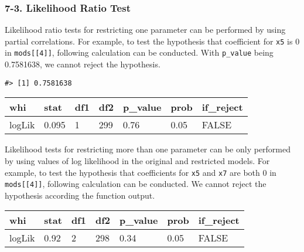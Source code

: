 \documentclass[main.tex]{subfiles}
\begin{document}
\hypertarget{likelihood-ratio-test}{%
\subsubsection{7-3. Likelihood Ratio Test}\label{likelihood-ratio-test}}

Likelihood ratio tests for restricting one parameter can be performed by
using partial correlations. For example, to test the hypothesis that
coefficient for \texttt{x5} is 0 in \texttt{mods{[}{[}4{]}{]}},
following calculation can be conducted. With \texttt{p\_value} being
0.7581638, we cannot reject the hypothesis.

\begin{Shaded}
\begin{Highlighting}[]
\StringTok{ }\OperatorTok{-}\StringTok{ } \OperatorTok{*}\StringTok{ }\NormalTok{(} \OperatorTok{-}\StringTok{ }\NormalTok{) }
\NormalTok{(} \OperatorTok{-}\StringTok{ }\NormalTok{))}
\end{Highlighting}
\end{Shaded}

\begin{verbatim}
#> [1] 0.7581638
\end{verbatim}

\begin{table}[H]
\centering
\begin{tabular}{lllllll}
\toprule
whi & stat & df1 & df2 & p\_value & prob & if\_reject\\
\midrule
logLik & 0.095 & 1 & 299 & 0.76 & 0.05 & FALSE\\
\bottomrule
\end{tabular}
\end{table}

Likelihood tests for restricting more than one parameter can be only
performed by using values of log likelihood in the original and
restricted models. For example, to test the hypothesis that coefficients
for \texttt{x5} and \texttt{x7} are both 0 in
\texttt{mods{[}{[}4{]}{]}}, following calculation can be conducted. We
cannot reject the hypothesis according the function output.

\begin{table}[H]
\centering
\begin{tabular}{lllllll}
\toprule
whi & stat & df1 & df2 & p\_value & prob & if\_reject\\
\midrule
logLik & 0.92 & 2 & 298 & 0.34 & 0.05 & FALSE\\
\bottomrule
\end{tabular}
\end{table}
\end{document}
